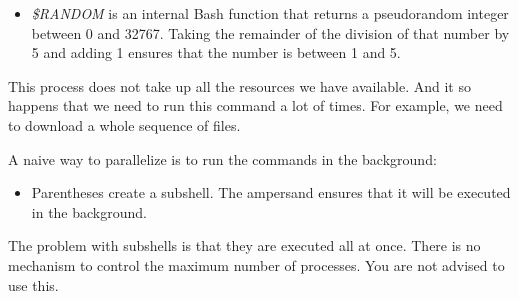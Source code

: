\documentclass[
]{book}
\newenvironment{Shaded}{\begin{snugshade}}{\end{snugshade}}
\newcommand{\BuiltInTok}[1]{#1}
\newcommand{\DataTypeTok}[1]{\textcolor[rgb]{0.13,0.29,0.53}{#1}}
\newcommand{\ExtensionTok}[1]{#1}
\newcommand{\KeywordTok}[1]{\textcolor[rgb]{0.13,0.29,0.53}{\textbf{#1}}}
\newcommand{\NormalTok}[1]{#1}
\newcommand{\OperatorTok}[1]{\textcolor[rgb]{0.81,0.36,0.00}{\textbf{#1}}}
\newcommand{\VariableTok}[1]{\textcolor[rgb]{0.00,0.00,0.00}{#1}}
\providecommand{\tightlist}{%
  \setlength{\itemsep}{0pt}\setlength{\parskip}{0pt}}
\theoremstyle{definition}
\theoremstyle{definition}
\theoremstyle{definition}
\theoremstyle{remark}
\begin{document}
\begin{itemize}
\tightlist
\item
  \emph{\$RANDOM} is an internal Bash function that returns a pseudorandom integer between 0 and 32767. Taking the remainder of the division of that number by 5 and adding 1 ensures that the number is between 1 and 5.
\end{itemize}

This process does not take up all the resources we have available. And it so happens that we need to run this command a lot of times. For example, we need to download a whole sequence of files.

A naive way to parallelize is to run the commands in the background:

\begin{Shaded}
\end{Shaded}

\begin{itemize}
\tightlist
\item
  Parentheses create a subshell. The ampersand ensures that it will be executed in the background.
\end{itemize}

The problem with subshells is that they are executed all at once. There is no mechanism to control the maximum number of processes. You are not advised to use this.
\end{document}
